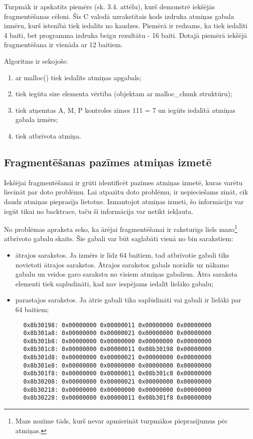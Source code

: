 Turpmāk ir apskatīts piemērs (sk. 3.4. attēlu), kurš demonstrē iekšējās fragmentēšanas cēloni.
Šīs C valodā uzrakstītais kods izdruka atmiņas gabala izmēru, kurš īstenībā tiek iedalīts no kaudzes.
Piemērā ir redzams, ka tiek iedalīti 4 baiti, bet programma izdruka beigu rezultātu - 16 baiti.
Dotajā piemērā iekšējā fragmentēšana ir vienāda ar 12 baitiem.

Algoritms ir sekojošs: 
\begin{enumerate}
\item ar malloc() tiek iedalīts atmiņas apgabals;
\item  tiek iegūta size elementa vērtība (objektam ar malloc\_chunk struktūru);
\item  tiek atņemtas A, M, P kontroles zīmes 111 = 7 un iegūts iedalītā atmiņas  gabala izmērs;
\item  tiek atbrīvota atmiņa.
\end{enumerate}



\subsection{Fragmentēšanas pazīmes atmiņas izmetē}

Iekšējai fragmentēšanai ir grūti identificēt pazīmes atmiņas izmetē, kuras varētu liecināt par doto problēmu.
Lai atpazītu doto problēmu, ir nepieciešams zināt, cik daudz atmiņas pieprasīja lietotne.
Izmantojot atmiņas izmeti, šo informāciju var iegūt tikai no backtrace, taču šī informācija var netikt iekļauta.

No problēmas apraksta seko, ka ārējai fragmentēšanai ir raksturīgs liels mazo\footnote{Mazs nozīme tāds, kurš nevar apmierināt turpmākos pieprasījumus pēc atmiņas.} atbrīvoto gabalu skaits.
Šie gabali var būt saglabāti vienā no bin sarakstiem:
\begin{itemize}
\item ātrajos sarakstos. Ja izmērs ir līdz 64 baitiem, tad atbrīvotie gabali tiks novietoti ātrajos sarakstos.
Ātrajos sarakstos gabals norādīs uz nākamo gabalu un veidos garo sarakstu no visiem atmiņas gabaliem.
Ātra saraksta elementi tiek sapludināti, kad nav iespējams iedalīt lielāko gabalu;
\item parastajos sarakstos. Ja ātrie gabali tika saplūdināti vai gabali ir lielāki par 64 baitiem;
\end{itemize}
\begin{figure}[h]
\begin{lstlisting}[style=customgdb]
0x8b30198: 0x00000000 0x00000011 0x00000000 0x00000000
0x8b301a8: 0x00000000 0x00000021 0x00000000 0x00000000
0x8b301b8: 0x00000000 0x00000000 0x00000000 0x00000000
0x8b301c8: 0x00000000 0x00000011 0x08b30198 0x00000000
0x8b301d8: 0x00000000 0x00000021 0x00000000 0x00000000
0x8b301e8: 0x00000000 0x00000000 0x00000000 0x00000000
0x8b301f8: 0x00000000 0x00000011 0x08b301c8 0x00000000
0x8b30208: 0x00000000 0x00000021 0x00000000 0x00000000
0x8b30218: 0x00000000 0x00000000 0x00000000 0x00000000
0x8b30228: 0x00000000 0x00000011 0x08b301f8 0x00000000
\end{lstlisting}
\caption{\textbf{\fontsize{11}{12}\selectfont {Fragmentētā kaudze}}}
\end{figure}

